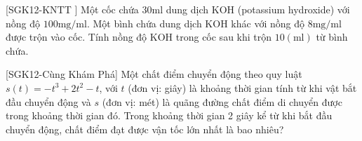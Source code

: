 \begin{bt}%
 [SGK12-KNTT ]
	Một cốc chứa $30 \mathrm{ml}$ dung dịch $\mathrm{KOH}$ (potassium hydroxide) với nồng độ $100 \mathrm{mg} / \mathrm{ml}$.
	Một bình chứa dung dịch $\mathrm{KOH}$ khác với nồng độ $8 \mathrm{mg} / \mathrm{ml}$ được trộn vào cốc.
	Tính nồng độ $\mathrm{KOH}$ trong cốc sau khi trộn $10 (\mathrm{ml})$ từ bình chứa.
\end{bt}

\begin{bt}%
 [SGK12-Cùng Khám Phá]
	Một chất điểm chuyển động theo quy luật $s(t)=-t^3+2t^2-t$, với $t$ (đơn vị: giây) là khoảng thời gian tính từ khi vật bắt đầu chuyển động và $s$ (đơn vị: mét) là quãng đường chất điểm di chuyển được trong khoảng thời gian đó. Trong khoảng thời gian 2 giây kể từ khi bắt đầu chuyển động, chất điểm đạt được vận tốc lớn nhất là bao nhiêu?
\end{bt}

